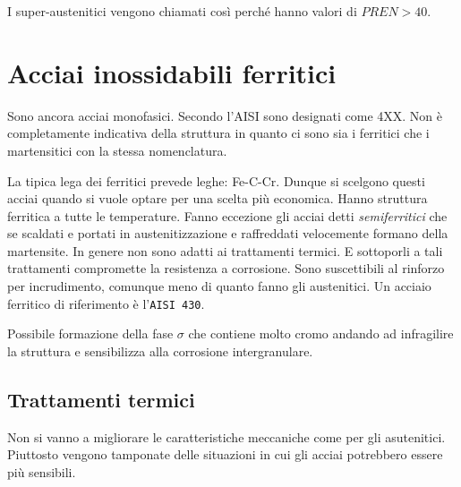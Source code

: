 I super-austenitici vengono chiamati così perché hanno valori di $PREN>40$.


\section{Acciai inossidabili ferritici}
Sono ancora acciai monofasici. Secondo l'\ac{AISI} sono 
designati come 4XX. Non è completamente indicativa della struttura in
quanto ci sono sia i ferritici che i martensitici con la stessa nomenclatura.

La tipica lega dei ferritici prevede leghe: Fe-C-Cr.
Dunque si scelgono questi acciai quando si vuole optare per una scelta più 
economica.
Hanno struttura ferritica a tutte le temperature. Fanno eccezione gli acciai
detti \emph{semiferritici} che se scaldati e portati in austenitizzazione 
e raffreddati velocemente formano della martensite.
In genere non sono adatti ai trattamenti termici. E sottoporli a tali 
trattamenti compromette la resistenza a corrosione.
Sono suscettibili al rinforzo per incrudimento, comunque meno di quanto fanno 
gli austenitici.
Un acciaio ferritico di riferimento è l'\texttt{\ac{AISI} 430}.


Possibile formazione della fase $\sigma$ che contiene molto cromo 
andando ad infragilire la struttura e sensibilizza alla corrosione 
intergranulare.

\subsection{Trattamenti termici}
Non si vanno a migliorare le caratteristiche meccaniche come per gli 
asutenitici. Piuttosto vengono tamponate delle situazioni in cui gli 
acciai potrebbero essere più sensibili.

